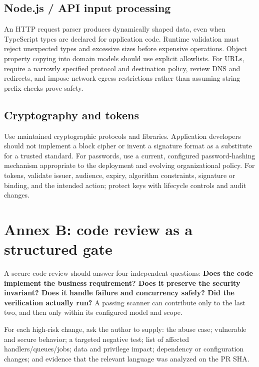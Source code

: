 \documentclass[
  letterpaper,
]{article}
\begin{document}
\subsection{Node.js / API input
processing}\label{node.js-api-input-processing}

An HTTP request parser produces dynamically shaped data, even when
TypeScript types are declared for application code. Runtime validation
must reject unexpected types and excessive sizes before expensive
operations. Object property copying into domain models should use
explicit allowlists. For URLs, require a narrowly specified protocol and
destination policy, review DNS and redirects, and impose network egress
restrictions rather than assuming string prefix checks prove safety.

\subsection{Cryptography and tokens}\label{cryptography-and-tokens}

Use maintained cryptographic protocols and libraries. Application
developers should not implement a block cipher or invent a signature
format as a substitute for a trusted standard. For passwords, use a
current, configured password-hashing mechanism appropriate to the
deployment and evolving organizational policy. For tokens, validate
issuer, audience, expiry, algorithm constraints, signature or binding,
and the intended action; protect keys with lifecycle controls and audit
changes.

\section{Annex B: code review as a structured
gate}\label{annex-b-code-review-as-a-structured-gate}

A secure code review should answer four independent questions:
\textbf{Does the code implement the business requirement? Does it
preserve the security invariant? Does it handle failure and concurrency
safely? Did the verification actually run?} A passing scanner can
contribute only to the last two, and then only within its configured
model and scope.

For each high-risk change, ask the author to supply: the abuse case;
vulnerable and secure behavior; a targeted negative test; list of
affected handlers/queues/jobs; data and privilege impact; dependency or
configuration changes; and evidence that the relevant language was
analyzed on the PR SHA.
\end{document}
